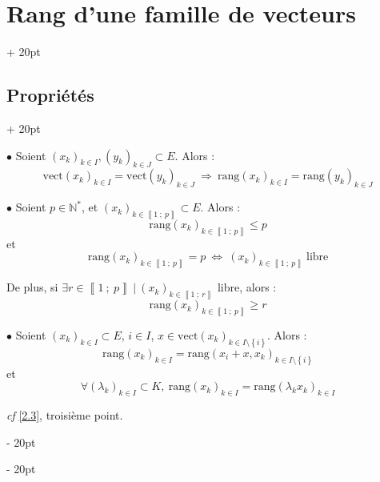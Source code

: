 \documentclass[a4paper, 12pt, twoside]{article}
\newcommand{\N}{\mathbb{N}} %
\newcommand{\nset}[2]{\left\llbracket #1\ ;\ #2 \right\rrbracket}
\newcommand{\set}[1]{\left\{ #1 \right\}}
\newcommand{\ssi}{\ \Leftrightarrow \ }
\renewcommand{\le}{\leqslant}
\renewcommand{\ge}{\geqslant}
\newcommand{\ind}[1][20pt]{\advance\leftskip + #1}
\newcommand{\deind}[1][20pt]{\advance\leftskip - #1}
\newenvironment{indt}[2][20pt]{#2 \par \ind[#1]}{\par \deind} %
\begin{document}
\begin{indt}{\section{Rang d'une famille de vecteurs}}
\begin{indt}{\subsection{Propriétés}}
            \vspace{12pt}
            
            $\bullet$ Soient $(x_k)_{k \in I}, (y_k)_{k \in J} \subset E$. Alors :
                \[ \mathrm{vect}(x_k)_{k \in I} = \mathrm{vect}(y_k)_{k \in J}\ \Rightarrow\ \mathrm{rang}(x_k)_{k \in I} = \mathrm{rang}(y_k)_{k \in J} \]
            
            \vspace{12pt}
            
            $\bullet$ Soient $p \in \N^*$, et $(x_k)_{k \in \nset 1 p} \subset E$. Alors :
                \[ \mathrm{rang}(x_k)_{k \in \nset 1 p} \le p \]
            et
                \[ \mathrm{rang}(x_k)_{k \in \nset 1 p} = p \ssi (x_k)_{k \in \nset 1 p}\ \text{libre} \]
                
            De plus, si $\exists r \in \nset 1 p\ |\ (x_k)_{k \in \nset 1 r}$ libre, alors :
                \[ \mathrm{rang}(x_k)_{k \in \nset 1 p} \ge r \]
            
            \vspace{12pt}
            
            $\bullet$ Soient $(x_k)_{k \in I} \subset E$, $i \in I$, $x \in \mathrm{vect}(x_k)_{k \in I \setminus \set i}$. Alors :
                \[ \mathrm{rang}(x_k)_{k \in I} = \mathrm{rang}(x_i + x, x_k)_{k \in I \setminus \set i} \]
            et
                \[ \forall (\lambda_k)_{k \in I} \subset K,\ \mathrm{rang}(x_k)_{k \in I} = \mathrm{rang}(\lambda_k x_k)_{k \in I} \]
            
            \textit{cf} \ref{2.3}, troisième point.
        \end{indt}
        
    \end{indt}
    
    \vspace{12pt}
    
\end{document}
